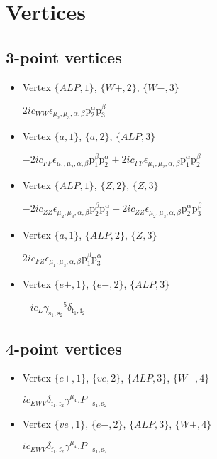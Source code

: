 \documentclass[11pt]{article}
\newenvironment{respr}[0]{\sloppy\begin{flushleft}\hspace*{0.75cm}\(}{\)\end{flushleft}\fussy}
\begin{document}
\section{Vertices}

\subsection{ 3-point vertices}

\begin{itemize}
\item
Vertex $\{ALP, 1\} $, $\{W+, 2\} $, $\{W-, 3\} $
\begin{respr}
2 i c_{WW} \epsilon _{\mu _2,\mu _3,\alpha,\beta} \text{p}_2^{\alpha} \text{p}_3^{\beta}\end{respr}
\item
Vertex $\{a, 1\} $, $\{a, 2\} $, $\{ALP, 3\} $
\begin{respr}
-2 i c_{FF} \epsilon _{\mu _1,\mu _2,\alpha,\beta} \text{p}_1^{\beta} \text{p}_2^{\alpha}+2 i c_{FF} \epsilon _{\mu _1,\mu _2,\alpha,\beta} \text{p}_1^{\alpha} \text{p}_2^{\beta}\end{respr}
\item
Vertex $\{ALP, 1\} $, $\{Z, 2\} $, $\{Z, 3\} $
\begin{respr}
-2 i c_{ZZ} \epsilon _{\mu _2,\mu _3,\alpha,\beta} \text{p}_2^{\beta} \text{p}_3^{\alpha}+2 i c_{ZZ} \epsilon _{\mu _2,\mu _3,\alpha,\beta} \text{p}_2^{\alpha} \text{p}_3^{\beta}\end{respr}
\item
Vertex $\{a, 1\} $, $\{ALP, 2\} $, $\{Z, 3\} $
\begin{respr}
2 i c_{FZ} \epsilon _{\mu _1,\mu_3,\alpha,\beta} \text{p}_1^{\beta} \text{p}_3^{\alpha}\end{respr}
\item
Vertex $\{e+, 1\} $, $\{e-, 2\} $, $\{ALP, 3\} $
\begin{respr}
-i c_{L} \gamma _{\text{s}_1,\text{s}_2}{}^5 \delta _{\text{f}_1,\text{f}_2}\end{respr}
\end{itemize}

\subsection{ 4-point vertices}

\begin{itemize}
\item
Vertex $\{e+, 1\} $, $\{ve, 2\} $, $\{ALP, 3\} $, $\{W-, 4\} $
\begin{respr}
i c_{EWV} \delta _{\text{f}_1,\text{f}_2} \gamma ^{\mu _4}.P_-{}_{\text{s}_1,\text{s}_2}\end{respr}
\item
Vertex $\{ve~, 1\} $, $\{e-, 2\} $, $\{ALP, 3\} $, $\{W+, 4\} $
\begin{respr}
i c_{EWV} \delta _{\text{f}_1,\text{f}_2} \gamma ^{\mu _4}.P_+{}_{\text{s}_1,\text{s}_2}\end{respr}
\end{itemize}
\end{document}

